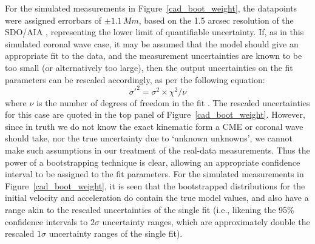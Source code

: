 \documentclass[structabstract]{aa}
\begin{document}
For the simulated measurements in Figure~\ref{cad_boot_weight}, the datapoints were assigned errorbars of $\pm1.1\,Mm$, based on the 1.5 arcsec resolution of the SDO/AIA \citep{2012SoPh..275...17L}, representing the lower limit of quantifiable uncertainty. If, as in this simulated coronal wave case, it may be assumed that the model should give an appropriate fit to the data, and the measurement uncertainties are known to be too small (or alternatively too large), then the output uncertainties on the fit parameters can be rescaled accordingly, as per the following equation:
\begin{equation}
\sigma'^2 = \sigma^2 \times \chi^2 / \nu
\end{equation}
where $\nu$ is the number of degrees of freedom in the fit \citep[see, for example,][]{2003drea.book.....B}. The rescaled uncertainties for this case are quoted in the top panel of Figure~\ref{cad_boot_weight}. However, since in truth we do not know the exact kinematic form a CME or coronal wave should take, nor the true uncertainty due to `unknown unknowns', we cannot make such assumptions in our treatment of the real-data measurements. Thus the power of a bootstrapping technique is clear, allowing an appropriate confidence interval to be assigned to the fit parameters. For the simulated measurements in Figure~\ref{cad_boot_weight}, it is seen that the bootstrapped distributions for the initial velocity and acceleration do contain the true model values, and also have a range akin to the rescaled uncertainties of the single fit (i.e., likening the 95\% confidence intervals to $2\sigma$ uncertainty ranges, which are approximately double the rescaled $1\sigma$ uncertainty ranges of the single fit).
\end{document}
